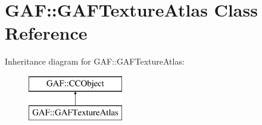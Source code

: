 \hypertarget{class_g_a_f_1_1_g_a_f_texture_atlas}{\section{G\-A\-F\-:\-:G\-A\-F\-Texture\-Atlas Class Reference}
\label{class_g_a_f_1_1_g_a_f_texture_atlas}
}
Inheritance diagram for G\-A\-F\-:\-:G\-A\-F\-Texture\-Atlas\-:\begin{figure}[H]
\begin{center}
\leavevmode
\includegraphics[height=2.000000cm]{class_g_a_f_1_1_g_a_f_texture_atlas}
\end{center}
\end{figure}
